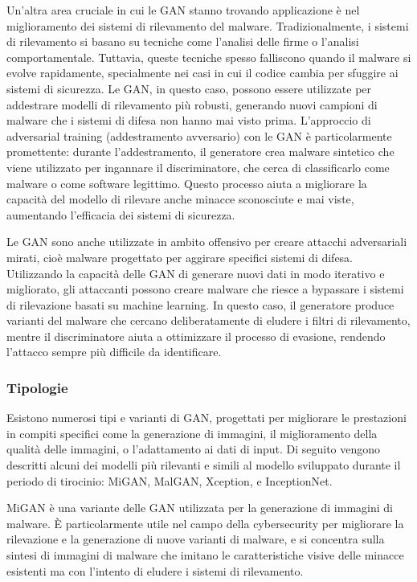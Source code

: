 Un'altra area cruciale in cui le GAN stanno trovando applicazione è nel miglioramento dei sistemi di rilevamento del malware. Tradizionalmente, i sistemi di rilevamento si basano su tecniche come l'analisi delle firme o l'analisi comportamentale. Tuttavia, queste tecniche spesso falliscono quando il malware si evolve rapidamente, specialmente nei casi in cui il codice cambia per sfuggire ai sistemi di sicurezza. Le GAN, in questo caso, possono essere utilizzate per addestrare modelli di rilevamento più robusti, generando nuovi campioni di malware che i sistemi di difesa non hanno mai visto prima.
L'approccio di adversarial training (addestramento avversario) con le GAN è particolarmente promettente: durante l'addestramento, il generatore crea malware sintetico che viene utilizzato per ingannare il discriminatore, che cerca di classificarlo come malware o come software legittimo. Questo processo aiuta a migliorare la capacità del modello di rilevare anche minacce sconosciute e mai viste, aumentando l'efficacia dei sistemi di sicurezza.

Le GAN sono anche utilizzate in ambito offensivo per creare attacchi adversariali mirati, cioè malware progettato per aggirare specifici sistemi di difesa. Utilizzando la capacità delle GAN di generare nuovi dati in modo iterativo e migliorato, gli attaccanti possono creare malware che riesce a bypassare i sistemi di rilevazione basati su machine learning. In questo caso, il generatore produce varianti del malware che cercano deliberatamente di eludere i filtri di rilevamento, mentre il discriminatore aiuta a ottimizzare il processo di evasione, rendendo l'attacco sempre più difficile da identificare.

\subsubsection{Tipologie}
Esistono numerosi tipi e varianti di GAN, progettati per migliorare le prestazioni in compiti specifici come la generazione di immagini, il miglioramento della qualità delle immagini, o l'adattamento ai dati di input. Di seguito vengono descritti alcuni dei modelli più rilevanti e simili al modello sviluppato durante il periodo di tirocinio: MiGAN, MalGAN, Xception, e InceptionNet.

MiGAN è una variante delle GAN utilizzata per la generazione di immagini di malware. È particolarmente utile nel campo della cybersecurity per migliorare la rilevazione e la generazione di nuove varianti di malware, e si concentra sulla sintesi di immagini di malware che imitano le caratteristiche visive delle minacce esistenti ma con l'intento di eludere i sistemi di rilevamento.


